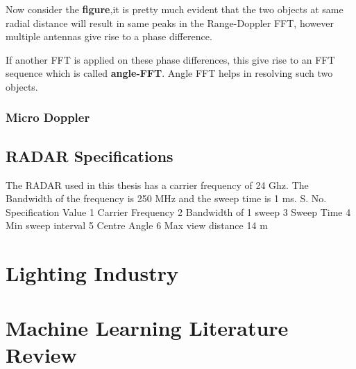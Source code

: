 Now consider the \textbf{figure},it is pretty much evident that the two objects at same radial distance will result in same peaks in the Range-Doppler FFT, however multiple antennas give rise to a phase difference.




If another FFT is applied on these phase differences, this give rise to an FFT sequence which is called \textbf{angle-FFT}. Angle FFT helps in resolving such two objects.


\subsubsection{Micro Doppler}


\subsection{RADAR Specifications}
The RADAR used in this thesis has a carrier frequency of 24 Ghz. The Bandwidth of the frequency is 250 MHz and the sweep time is 1 ms.
S. No.	Specification	Value
1	Carrier Frequency	
2	Bandwidth of 1 sweep	
3	Sweep Time	
4	Min sweep interval	
5	Centre Angle	
6	Max view distance 	14 m
		
\section{Lighting Industry}
\section{Machine Learning Literature Review}




